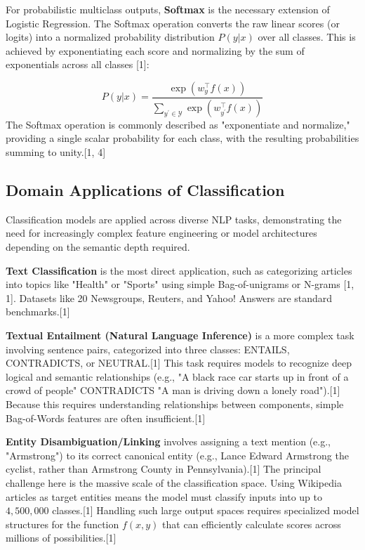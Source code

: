 \documentclass{article}
\begin{document}
For probabilistic multiclass outputs, \textbf{Softmax} is the necessary extension of Logistic Regression. The Softmax operation converts the raw linear scores (or logits) into a normalized probability distribution $P(y|x)$ over all classes. This is achieved by exponentiating each score and normalizing by the sum of exponentials across all classes [1]:

\begin{equation*}
P(y|x)=\frac{\exp(w_{y}^{\top}f(x))}{\sum_{y^{\prime}\in\mathcal{Y}}\exp(w_{y^{\prime}}^{\top}f(x))}
\end{equation*}
The Softmax operation is commonly described as "exponentiate and normalize," providing a single scalar probability for each class, with the resulting probabilities summing to unity.[1, 4]

\subsection{Domain Applications of Classification}

Classification models are applied across diverse NLP tasks, demonstrating the need for increasingly complex feature engineering or model architectures depending on the semantic depth required.

\textbf{Text Classification} is the most direct application, such as categorizing articles into topics like "Health" or "Sports" using simple Bag-of-unigrams or N-grams [1, 1]. Datasets like 20 Newsgroups, Reuters, and Yahoo! Answers are standard benchmarks.[1]

\textbf{Textual Entailment (Natural Language Inference)} is a more complex task involving sentence pairs, categorized into three classes: ENTAILS, CONTRADICTS, or NEUTRAL.[1] This task requires models to recognize deep logical and semantic relationships (e.g., "A black race car starts up in front of a crowd of people" CONTRADICTS "A man is driving down a lonely road").[1] Because this requires understanding relationships between components, simple Bag-of-Words features are often insufficient.[1]

\textbf{Entity Disambiguation/Linking} involves assigning a text mention (e.g., "Armstrong") to its correct canonical entity (e.g., Lance Edward Armstrong the cyclist, rather than Armstrong County in Pennsylvania).[1] The principal challenge here is the massive scale of the classification space. Using Wikipedia articles as target entities means the model must classify inputs into up to $4,500,000$ classes.[1] Handling such large output spaces requires specialized model structures for the function $f(x,y)$ that can efficiently calculate scores across millions of possibilities.[1]
\end{document}
